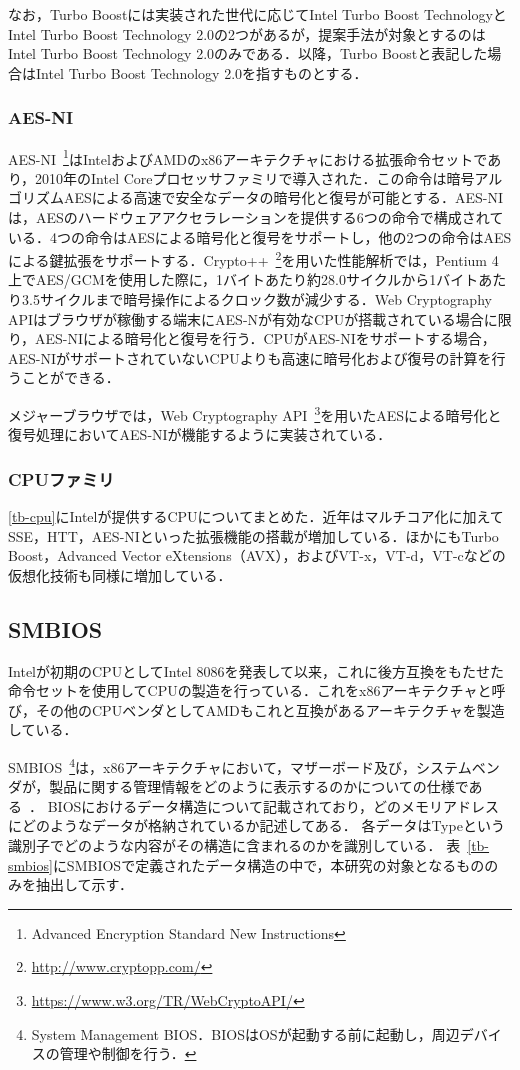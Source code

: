なお，Turbo Boostには実装された世代に応じてIntel Turbo Boost TechnologyとIntel Turbo Boost Technology 2.0の2つがあるが，提案手法が対象とするのはIntel Turbo Boost Technology 2.0のみである．以降，Turbo Boostと表記した場合はIntel Turbo Boost Technology 2.0を指すものとする．
\subsubsection{AES-NI}
AES-NI~\footnote{Advanced Encryption Standard New Instructions}はIntelおよびAMDのx86アーキテクチャにおける拡張命令セットであり，2010年のIntel Coreプロセッサファミリで導入された．この命令は暗号アルゴリズムAESによる高速で安全なデータの暗号化と復号が可能とする．AES-NIは，AESのハードウェアアクセラレーションを提供する6つの命令で構成されている．4つの命令はAESによる暗号化と復号をサポートし，他の2つの命令はAESによる鍵拡張をサポートする．Crypto++~\footnote{\url{http://www.cryptopp.com/}}を用いた性能解析では，Pentium 4上でAES/GCMを使用した際に，1バイトあたり約28.0サイクルから1バイトあたり3.5サイクルまで暗号操作によるクロック数が減少する．Web Cryptography APIはブラウザが稼働する端末にAES-Nが有効なCPUが搭載されている場合に限り，AES-NIによる暗号化と復号を行う．CPUがAES-NIをサポートする場合，AES-NIがサポートされていないCPUよりも高速に暗号化および復号の計算を行うことができる．

メジャーブラウザでは，Web Cryptography API~\footnote{\url{https://www.w3.org/TR/WebCryptoAPI/}}を用いたAESによる暗号化と復号処理においてAES-NIが機能するように実装されている．
\subsubsection{CPUファミリ}
\ref{tb-cpu}にIntelが提供するCPUについてまとめた．近年はマルチコア化に加えてSSE，HTT，AES-NIといった拡張機能の搭載が増加している．ほかにもTurbo Boost，Advanced Vector eXtensions（AVX），およびVT-x，VT-d，VT-cなどの仮想化技術も同様に増加している．
\subsection{SMBIOS}
Intelが初期のCPUとしてIntel 8086を発表して以来，これに後方互換をもたせた命令セットを使用してCPUの製造を行っている．これをx86アーキテクチャと呼び，その他のCPUベンダとしてAMDもこれと互換があるアーキテクチャを製造している．

SMBIOS~\footnote{System Management BIOS．BIOSはOSが起動する前に起動し，周辺デバイスの管理や制御を行う．}は，x86アーキテクチャにおいて，マザーボード及び，システムベンダが，製品に関する管理情報をどのように表示するのかについての仕様である~\cite{smbios_spec}．
BIOSにおけるデータ構造について記載されており，どのメモリアドレスにどのようなデータが格納されているか記述してある．
各データはTypeという識別子でどのような内容がその構造に含まれるのかを識別している．
表~\ref{tb-smbios}にSMBIOSで定義されたデータ構造の中で，本研究の対象となるもののみを抽出して示す．


